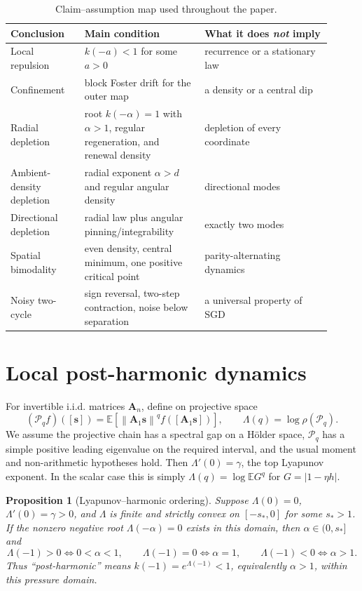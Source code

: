 \documentclass[10pt]{article}
\newtheorem{proposition}[theorem]{Proposition}
\theoremstyle{definition}
\theoremstyle{remark}
\newcommand{\E}{\mathbb E}
\newcommand{\norm}[1]{\left\lVert#1\right\rVert}
\newcommand{\svec}{\mathbf s}
\newcommand{\Avec}{\mathbf A}
\begin{document}
\begin{table}[t]
\centering
\small
\begin{tabular}{p{0.21\linewidth}p{0.34\linewidth}p{0.36\linewidth}}
\toprule
Conclusion & Main condition & What it does \emph{not} imply \\
\midrule
Local repulsion & $k(-a)<1$ for some $a>0$ & recurrence or a stationary law \\
Confinement & block Foster drift for the outer map & a density or a central dip \\
Radial depletion & root $k(-\alpha)=1$ with $\alpha>1$, regular regeneration, and renewal density & depletion of every coordinate \\
Ambient-density depletion & radial exponent $\alpha>d$ and regular angular density & directional modes \\
Directional depletion & radial law plus angular pinning/integrability & exactly two modes \\
Spatial bimodality & even density, central minimum, one positive critical point & parity-alternating dynamics \\
Noisy two-cycle & sign reversal, two-step contraction, noise below separation & a universal property of SGD \\
\bottomrule
\end{tabular}
\caption{Claim--assumption map used throughout the paper.}
\label{tab:claims}
\end{table}

\section{Local post-harmonic dynamics}

For invertible i.i.d. matrices $\Avec_n$, define on projective space
\begin{equation}
 (\mathcal P_q f)([\svec])=
 \E\!\left[\norm{\Avec_1\svec}^{q}
 f\!\left([\Avec_1\svec]\right)\right],
 \qquad \Lambda(q)=\log\rho(\mathcal P_q).
 \label{eq:transfer}
\end{equation}
We assume the projective chain has a spectral gap on a H\"older space,
$\mathcal P_q$ has a simple positive leading eigenvalue on the required
interval, and the usual moment and non-arithmetic hypotheses hold.  Then
$\Lambda'(0)=\gamma$, the top Lyapunov exponent.  In the scalar case this is
simply $\Lambda(q)=\log\E G^q$ for $G=|1-\eta h|$.

\begin{proposition}[Lyapunov--harmonic ordering]
\label{prop:harmonic-order}
Suppose $\Lambda(0)=0$, $\Lambda'(0)=\gamma>0$, and $\Lambda$ is finite and
strictly convex on $[-s_*,0]$ for some $s_*>1$.  If the nonzero negative root
$\Lambda(-\alpha)=0$ exists in this domain, then $\alpha\in(0,s_*]$ and
\begin{equation}
 \Lambda(-1)>0\Longleftrightarrow0<\alpha<1,
 \qquad \Lambda(-1)=0\Longleftrightarrow\alpha=1,
 \qquad \Lambda(-1)<0\Longleftrightarrow\alpha>1.
 \label{eq:harmonic-order}
\end{equation}
Thus ``post-harmonic'' means $k(-1)=e^{\Lambda(-1)}<1$, equivalently
$\alpha>1$, within this pressure domain.
\end{proposition}
\end{document}
